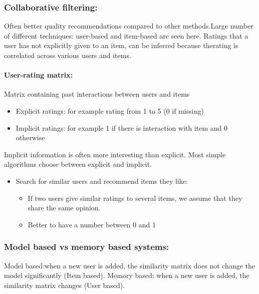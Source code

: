 \documentclass[12pt]{article}
\begin{document}
\subsubsection{Collaborative filtering:}
Often better quality recommendations compared to other methods.Large number of different techniques: user-based and item-based are seen here. Ratings that a user has not explicitly given to an item, can be inferred because therating is correlated across various users and items.
\paragraph{User-rating matrix:}
Matrix containing past interactions between users and
items\begin{itemize}
    \item Explicit ratings: for example rating from 1 to 5 (0 if
    missing)
    \item Implicit ratings: for example 1 if there is interaction
    with item and 0 otherwise
\end{itemize}
Implicit information is often more interesting than explicit. Most simple algorithms choose between explicit and implicit.
\begin{itemize}
    \item Search for similar users and recommend items they like:\begin{itemize}
        \item If two users give similar ratings to several items, we assume that they share the same opinion. 
        \item Better to have a number between 0 and 1
    \end{itemize}
\end{itemize}
\subsubsection{Model based vs memory based systems:}
Model based:when a new user is added, the similarity
matrix does not change the model significantly (Item based).
Memory based: when a new user is added, the
similarity matrix changes (User based).
\end{document}

